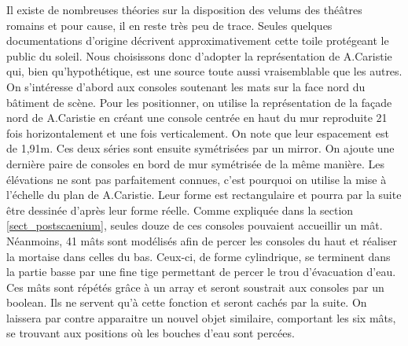 Il existe de nombreuses théories sur la disposition des \glspl{velum} des théâtres romains et pour cause, il en reste très peu de trace. Seules quelques documentations d'origine  décrivent approximativement cette toile protégeant le public du soleil. Nous choisissons donc d'adopter la représentation de A.Caristie \cite[Pl. VI]{orangePl} qui, bien qu'hypothétique, est une source toute aussi vraisemblable que les autres. On s'intéresse d'abord aux consoles soutenant les mats sur la face nord du bâtiment de scène. Pour les positionner, on utilise la représentation de la façade nord de A.Caristie \cite[Pl. III]{orangePl} en créant une console centrée en haut du mur reproduite 21 fois horizontalement et une fois verticalement. On note que leur espacement est de 1,91m. Ces deux séries sont ensuite symétrisées par un \gls{mirror}. On ajoute une dernière paire de consoles en bord de mur symétrisée de la même manière. Les élévations ne sont pas parfaitement connues, c'est pourquoi on utilise la mise à l'échelle du plan de A.Caristie. Leur forme est rectangulaire et pourra par la suite être dessinée d'après leur forme réelle. Comme expliquée dans la section \ref{sect_postscaenium}, seules douze de ces consoles pouvaient accueillir un mât. Néanmoins, 41 mâts sont modélisés afin de percer les consoles du haut et réaliser la mortaise dans celles du bas. Ceux-ci, de forme cylindrique, se terminent dans la partie basse par une fine tige permettant de percer le trou d'évacuation d'eau. Ces mâts sont répétés grâce à un \gls{array} et seront soustrait aux consoles par un \gls{boolean}. Ils ne servent qu'à cette fonction et seront cachés par la suite. On laissera par contre apparaitre un nouvel objet similaire, comportant les six mâts, se trouvant aux positions où les bouches d'eau sont percées. 


